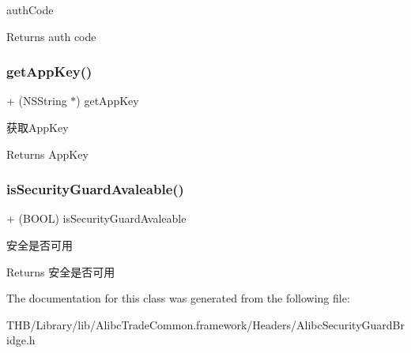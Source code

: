 auth\+Code

\begin{DoxyReturn}{Returns}
auth code 
\end{DoxyReturn}
\mbox{\label{interface_alibc_security_guard_bridge_a33246f4937b6364e7a652c8397c7feca}} 
\subsubsection{\texorpdfstring{get\+App\+Key()}{getAppKey()}}
{\footnotesize\ttfamily + (N\+S\+String $\ast$) get\+App\+Key \begin{DoxyParamCaption}{ }\end{DoxyParamCaption}}

获取\+App\+Key

\begin{DoxyReturn}{Returns}
App\+Key 
\end{DoxyReturn}
\mbox{\label{interface_alibc_security_guard_bridge_af7449b81d190d919f1be363502f6da1d}} 
\subsubsection{\texorpdfstring{is\+Security\+Guard\+Avaleable()}{isSecurityGuardAvaleable()}}
{\footnotesize\ttfamily + (B\+O\+OL) is\+Security\+Guard\+Avaleable \begin{DoxyParamCaption}{ }\end{DoxyParamCaption}}

安全是否可用

\begin{DoxyReturn}{Returns}
安全是否可用 
\end{DoxyReturn}


The documentation for this class was generated from the following file\+:\begin{DoxyCompactItemize}
\item 
T\+H\+B/\+Library/lib/\+Alibc\+Trade\+Common.\+framework/\+Headers/Alibc\+Security\+Guard\+Bridge.\+h\end{DoxyCompactItemize}
